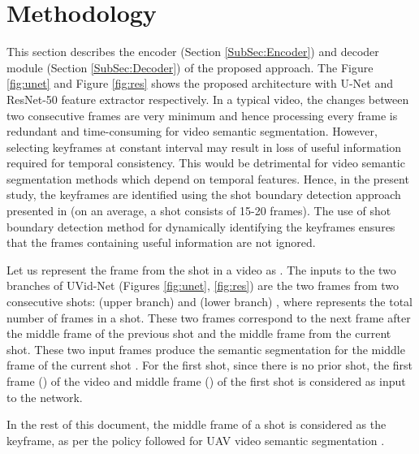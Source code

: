 \documentclass[journal]{IEEEtran}
\begin{document}
\section{Methodology}
\label{sec:methodology}


\par This section describes the encoder (Section \ref{SubSec:Encoder}) and decoder module (Section \ref{SubSec:Decoder}) of the proposed approach.  The Figure \ref{fig:unet} and  Figure \ref{fig:res} shows the proposed architecture with U-Net and ResNet-50 feature extractor respectively. In a typical video, the changes between two consecutive frames are very minimum and hence processing every frame is redundant and time-consuming for video semantic segmentation. However,  selecting keyframes at constant interval may result in loss of useful information required for temporal consistency. This would be detrimental for video semantic segmentation methods which depend on temporal features. Hence, in the present study, the keyframes are identified using the shot boundary detection approach presented in \cite{19} (on an average, a shot consists of 15-20 frames). The use of shot boundary detection method for dynamically identifying the keyframes ensures that the frames containing useful information are not ignored.

\par Let us represent the  frame from the  shot in a video as . The inputs to the two branches of UVid-Net (Figures \ref{fig:unet}, \ref{fig:res}) are the two frames from two consecutive shots:  (upper branch) and  (lower branch) , where  represents the total number of frames in a shot. These two frames correspond to the next frame after the middle frame of the previous shot   and the middle frame from the current shot. These two input frames produce the semantic segmentation for the middle frame of the current shot   . For the first shot, since there is no prior shot, the first frame () of the video and middle frame () of the first shot is considered as input to  the network.
 
In the rest of this document, the middle frame of a shot is considered as the keyframe, as per the policy followed for UAV video semantic segmentation \cite{19}.
\end{document}
